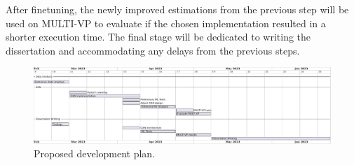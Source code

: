 After finetuning, the newly improved estimations from the previous step will be used on MULTI-VP to evaluate if the chosen implementation resulted in a shorter execution time. The final stage will be dedicated to writing the dissertation and accommodating any delays from the previous steps.

\begin{figure}[ht]
\centering
\includegraphics[width=\textwidth]{figures/work_plan.pdf}
\caption{Proposed development plan.}
\label{fig:work_plan}
\end{figure}
